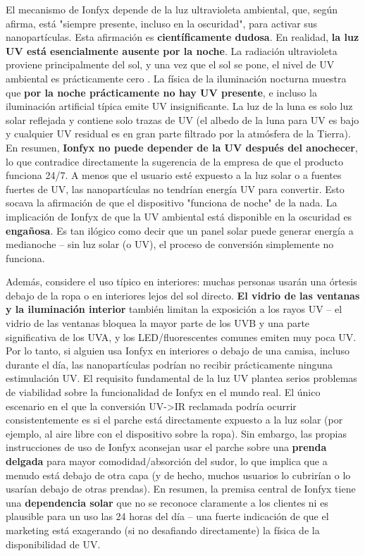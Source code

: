 \documentclass{article}
\begin{document}
El mecanismo de Ionfyx depende de la luz ultravioleta ambiental, que, según afirma, está "siempre presente, incluso en la oscuridad", para activar sus nanopartículas. Esta afirmación es \textbf{científicamente dudosa}. En realidad, \textbf{la luz UV está esencialmente ausente por la noche}. La radiación ultravioleta proviene principalmente del sol, y una vez que el sol se pone, el nivel de UV ambiental es prácticamente cero \cite{physics_uv_dark}. La física de la iluminación nocturna muestra que \textbf{por la noche prácticamente no hay UV presente}, e incluso la iluminación artificial típica emite UV insignificante. La luz de la luna es solo luz solar reflejada y contiene solo trazas de UV (el albedo de la luna para UV es bajo y cualquier UV residual es en gran parte filtrado por la atmósfera de la Tierra). En resumen, \textbf{Ionfyx no puede depender de la UV después del anochecer}, lo que contradice directamente la sugerencia de la empresa de que el producto funciona 24/7. A menos que el usuario esté expuesto a la luz solar o a fuentes fuertes de UV, las nanopartículas no tendrían energía UV para convertir. Esto socava la afirmación de que el dispositivo "funciona de noche" de la nada. La implicación de Ionfyx de que la UV ambiental está disponible en la oscuridad es \textbf{engañosa}. Es tan ilógico como decir que un panel solar puede generar energía a medianoche – sin luz solar (o UV), el proceso de conversión simplemente no funciona.

Además, considere el uso típico en interiores: muchas personas usarán una órtesis debajo de la ropa o en interiores lejos del sol directo. \textbf{El vidrio de las ventanas y la iluminación interior} también limitan la exposición a los rayos UV – el vidrio de las ventanas bloquea la mayor parte de los UVB y una parte significativa de los UVA, y los LED/fluorescentes comunes emiten muy poca UV. Por lo tanto, si alguien usa Ionfyx en interiores o debajo de una camisa, incluso durante el día, las nanopartículas podrían no recibir prácticamente ninguna estimulación UV. El requisito fundamental de la luz UV plantea serios problemas de viabilidad sobre la funcionalidad de Ionfyx en el mundo real. El único escenario en el que la conversión UV->IR reclamada podría ocurrir consistentemente es si el parche está directamente expuesto a la luz solar (por ejemplo, al aire libre con el dispositivo sobre la ropa). Sin embargo, las propias instrucciones de uso de Ionfyx aconsejan usar el parche sobre una \textbf{prenda delgada} para mayor comodidad/absorción del sudor, lo que implica que a menudo está debajo de otra capa (y de hecho, muchos usuarios lo cubrirían o lo usarían debajo de otras prendas). En resumen, la premisa central de Ionfyx tiene una \textbf{dependencia solar} que no se reconoce claramente a los clientes ni es plausible para un uso las 24 horas del día – una fuerte indicación de que el marketing está exagerando (si no desafiando directamente) la física de la disponibilidad de UV.
\end{document}
